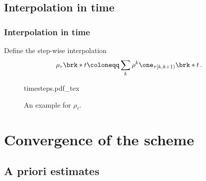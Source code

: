 \subsection{Interpolation in time}

\begin{frame}
  \frametitle{Interpolation in time}
  Define the step-wise interpolation
  \begin{align*}
    \rho_\tau\brk*{t}
    \coloneqq\sum_k\rho^k\one_{\tau[k,k+1)}\brk*{t}\,.
  \end{align*}
  \vspace*{-0.5cm}
  \begin{figure}
    \def\svgwidth{7cm}
    {timesteps.pdf_tex}
    \caption{An example for $\rho_\tau$.}
  \end{figure}
\end{frame}

\section{Convergence of the scheme}
\subsection{A priori estimates}

